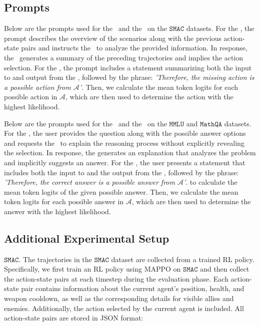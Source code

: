 \subsection{Prompts}\label{appx:prompt}
Below are the prompts used for the \elm~and the \rlm~on the $\mathtt{SMAC}$ datasets. For the \elm, the prompt describes the overview of the scenarios along with the previous action-state pairs and instructs the \elm~to analyze the provided information. In response, the \elm~generates a summary of the preceding trajectories and implies the action selection. For the \rlm, the prompt includes a statement summarizing both the input to and output from the \elm, followed by the phrase: \emph{'Therefore, the missing action is {a possible action from $\mathcal{A}$}'}. Then, we calculate the mean token logits for each possible action in $\mathcal{A}$, which are then used to determine the action with the highest likelihood.




Below are the prompts used for the \elm~and the \rlm~on the $\mathtt{MMLU}$ and $\mathtt{MathQA}$ datasets. For the \elm, the user provides the question along with the possible answer options and requests the \elm~to explain the reasoning process without explicitly revealing the selection. In response, the \elm generates an explanation that analyzes the problem and implicitly suggests an answer. For the \rlm, the user presents a statement that includes both the input to and the output from the \elm, followed by the phrase: \emph{'Therefore, the correct answer is {a possible answer from $\mathcal{A}$}'}. to calculate the mean token logits of the given possible answer. Then, we calculate the mean token logits for each possible answer in $\mathcal{A}$, which are then used to determine the answer with the highest likelihood.




\subsection{Additional Experimental Setup}\label{appx:experimental_setup}

\textbf{$\mathtt{SMAC}$}. The trajectories in the $\mathtt{SMAC}$ dataset are collected from a trained RL policy. Specifically, we first train an RL policy using MAPPO on $\mathtt{SMAC}$ and then collect the action-state pairs at each timestep during the evaluation phase. Each action-state pair contains information about the current agent's position, health, and weapon cooldown, as well as the corresponding details for visible allies and enemies. Additionally, the action selected by the current agent is included. All action-state pairs are stored in JSON format:



